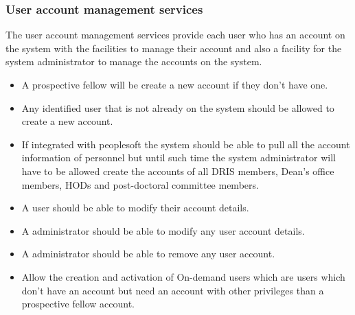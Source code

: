 \documentclass[12pt]{article}
\begin{document}
\subsubsection{User account management services}
	The user account management services provide each user who has an account on the system with the facilities to manage their account and also a facility for the system administrator to manage the accounts on the system.
	\begin{itemize}
		\item A prospective fellow will be create a new account if they don't have one.
		\item Any identified user that is not already on the system should be allowed to create a new account.
		\item If integrated with peoplesoft the system should be able to pull all the account information of personnel but until such time the system administrator will have to be allowed create the accounts of all DRIS members, Dean's office members, HODs and post-doctoral committee members.	
		\item A user should be able to modify their account details.
		\item A administrator should be able to modify any user account details.
		\item A administrator should be able to remove any user account.
		\item Allow the creation and activation of On-demand users which are users which don't have an account but need an account with other privileges than a prospective fellow account.
	\end{itemize}
	
\end{document}
